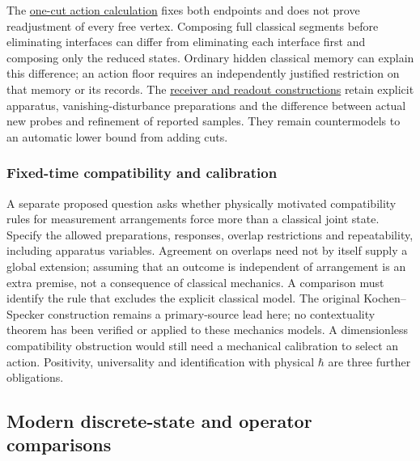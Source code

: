 \documentclass[11pt,a4paper]{article}
\begin{document}
The
\href{quantum-blocks-construct-newton.md\#projective-gaussian-preparation-and-raw-kinetic-action}{one-cut
action calculation} fixes both endpoints and does not prove readjustment
of every free vertex. Composing full classical segments before
eliminating interfaces can differ from eliminating each interface first
and composing only the reduced states. Ordinary hidden classical memory
can explain this difference; an action floor requires an independently
justified restriction on that memory or its records. The
\href{autonomous-finite-readout.md}{receiver and readout constructions}
retain explicit apparatus, vanishing-disturbance preparations and the
difference between actual new probes and refinement of reported samples.
They remain countermodels to an automatic lower bound from adding cuts.

\hypertarget{fixed-time-compatibility-and-calibration}{%
\subsubsection{Fixed-time compatibility and
calibration}\label{fixed-time-compatibility-and-calibration}}

A separate proposed question asks whether physically motivated
compatibility rules for measurement arrangements force more than a
classical joint state. Specify the allowed preparations, responses,
overlap restrictions and repeatability, including apparatus variables.
Agreement on overlaps need not by itself supply a global extension;
assuming that an outcome is independent of arrangement is an extra
premise, not a consequence of classical mechanics. A comparison must
identify the rule that excludes the explicit classical model. The
original Kochen--Specker construction remains a primary-source lead
here; no contextuality theorem has been verified or applied to these
mechanics models. A dimensionless compatibility obstruction would still
need a mechanical calibration to select an action. Positivity,
universality and identification with physical \(\hbar\) are three
further obligations.

\hypertarget{modern-discrete-state-and-operator-comparisons}{%
\subsection{Modern discrete-state and operator
comparisons}\label{modern-discrete-state-and-operator-comparisons}}
\end{document}
